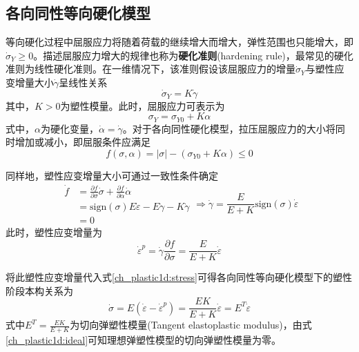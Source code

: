 \subsection{各向同性等向硬化模型}
等向硬化过程中屈服应力将随着荷载的继续增大而增大，弹性范围也只能增大，即$\dot \sigma_Y\ge0$。描述屈服应力增大的规律也称为\textbf{硬化准则}(hardening rule)，最常见的硬化准则为线性硬化准则。在一维情况下，该准则假设该屈服应力的增量$\dot \sigma_Y$与塑性应变增量大小$\dot \gamma$呈线性关系
\begin{equation}\label{ch_plastic1d:hardening}
\dot \sigma_Y = K \dot \gamma
\end{equation}
其中，$K>0$为塑性模量。此时，屈服应力可表示为
\begin{equation}
\sigma_Y = \sigma_{Y0} + K\alpha
\end{equation}
式中，$\alpha$为硬化变量，$\dot \alpha = \dot \gamma$。对于各向同性硬化模型，拉压屈服应力的大小将同时增加或减小，即屈服条件应满足
\begin{equation}
f(\sigma,\alpha) = \vert \sigma \vert - (\sigma_{Y0}+K\alpha) \le 0
\end{equation} \par
同样地，塑性应变增量大小可通过一致性条件确定
\begin{equation}
    \begin{split}
        \dot f &= \frac{\partial f}{\partial \sigma} \dot \sigma + \frac{\partial f}{\partial \alpha} \dot \alpha \\
               &= \mathrm{sign}(\sigma) E\dot \varepsilon - E \dot \gamma - K \dot \gamma \\
               &= 0
    \end{split} \Rightarrow
    \dot \gamma = \frac{E}{E+K} \mathrm{sign}(\sigma) \dot \varepsilon
\end{equation}
此时，塑性应变增量为
\begin{equation}
\dot \varepsilon^p = \dot \gamma \frac{\partial f}{\partial \sigma} = \frac{E}{E+K} \dot \varepsilon
\end{equation}\par
将此塑性应变增量代入式\eqref{ch_plastic1d:stress}可得各向同性等向硬化模型下的塑性阶段本构关系为
\begin{equation}
\dot \sigma = E(\dot \varepsilon - \dot \varepsilon^p) = \frac{EK}{E+K} \dot \varepsilon = E^T \dot \varepsilon
\end{equation}
式中$E^T=\frac{EK}{E+K}$为切向弹塑性模量(Tangent elastoplastic modulus)，由式\eqref{ch_plastic1d:ideal}可知理想弹塑性模型的切向弹塑性模量为零。

